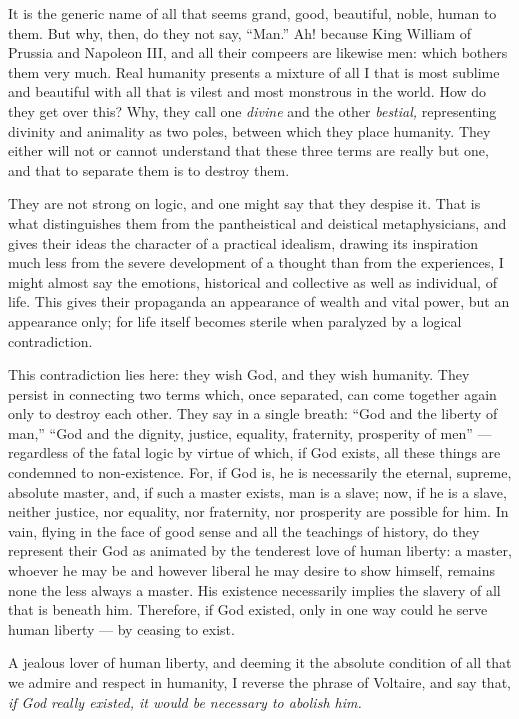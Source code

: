 \documentclass[12pt]{report}
\begin{document}
It is the generic name of all that seems grand, good, beautiful, noble, human to them. But why, then, do they not say, “Man.” Ah! because King William of Prussia and Napoleon III, and all their compeers are likewise men: which bothers them very much. Real humanity presents a mixture of all I that is most sublime and beautiful with all that is vilest and most monstrous in the world. How do they get over this? Why, they call one \emph{divine} and the other \emph{bestial,} representing divinity and animality as two poles, between which they place humanity. They either will not or cannot understand that these three terms are really but one, and that to separate them is to destroy them.


They are not strong on logic, and one might say that they despise it. That is what distinguishes them from the pantheistical and deistical metaphysicians, and gives their ideas the character of a practical idealism, drawing its inspiration much less from the severe development of a thought than from the experiences, I might almost say the emotions, historical and collective as well as individual, of life. This gives their propaganda an appearance of wealth and vital power, but an appearance only; for life itself becomes sterile when paralyzed by a logical contradiction.


This contradiction lies here: they wish God, and they wish humanity. They persist in connecting two terms which, once separated, can come together again only to destroy each other. They say in a single breath: “God and the liberty of man,” “God and the dignity, justice, equality, fraternity, prosperity of men” — regardless of the fatal logic by virtue of which, if God exists, all these things are condemned to non-existence. For, if God is, he is necessarily the eternal, supreme, absolute master, and, if such a master exists, man is a slave; now, if he is a slave, neither justice, nor equality, nor fraternity, nor prosperity are possible for him. In vain, flying in the face of good sense and all the teachings of history, do they represent their God as animated by the tenderest love of human liberty: a master, whoever he may be and however liberal he may desire to show himself, remains none the less always a master. His existence necessarily implies the slavery of all that is beneath him. Therefore, if God existed, only in one way could he serve human liberty — by ceasing to exist.


A jealous lover of human liberty, and deeming it the absolute condition of all that we admire and respect in humanity, I reverse the phrase of Voltaire, and say that, \emph{if God really existed, it would be necessary to abolish him.}
\end{document}
